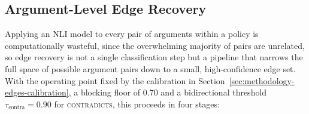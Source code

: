 \subsection{Argument-Level Edge Recovery}
\label{sec:methodology-edges}

Applying an NLI model to every pair of arguments within a policy is computationally wasteful,
since the overwhelming majority of pairs are unrelated, so edge recovery is not a single
classification step but a pipeline that narrows the full space of possible argument pairs down to
a small, high-confidence edge set. With the operating point fixed by the calibration in
Section~\ref{sec:methodology-edges-calibration}, a blocking floor of 0.70 and a bidirectional
threshold $\tau_{\text{contra}} = 0.90$ for \textsc{contradicts}, this proceeds in four stages:

